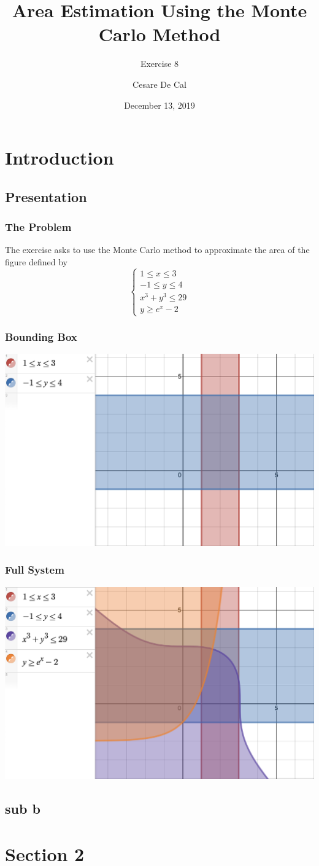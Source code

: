 \documentclass{beamer}
\title{Area Estimation Using the Monte Carlo Method}
\subtitle{Exercise 8}
\author{Cesare De Cal}
\institute{University of Antwerp - Erasmus Exchange}
\date{December 13, 2019}
\begin{document}
\begin{frame}
\titlepage
\end{frame}

\section{Introduction}
\subsection{Presentation}
\begin{frame}
\frametitle{The Problem}
The exercise asks to use the Monte Carlo method to approximate the area of the figure defined by
$$
\begin{cases}
1 \le x \le 3 \\
-1\le y \le 4 \\  
x^3+y^3\le 29 \\
y \ge e^x -2
\end{cases}$$
\end{frame}

\begin{frame}
\frametitle{Bounding Box}
\includegraphics[width=\textwidth,height=\textheight,keepaspectratio]{bounding_box.png}
\end{frame}

\begin{frame}
\frametitle{Full System}
\includegraphics[width=\textwidth,height=\textheight,keepaspectratio]{full_system.png}
\end{frame}

\subsection{sub b}

\section{Section 2}
\end{document}
